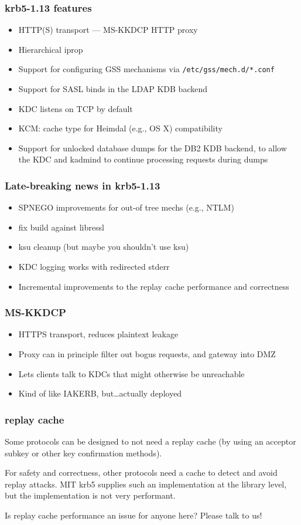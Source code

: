 \documentclass{beamer}
\begin{document}
\begin{frame}[fragile]
\frametitle{krb5-1.13 features}
\begin{itemize}
\item{HTTP(S) transport --- MS-KKDCP HTTP proxy}
\item{Hierarchical iprop}
\item{Support for configuring GSS mechanisms via \verb+/etc/gss/mech.d/*.conf+}
\item{Support for SASL binds in the LDAP KDB backend}
\item{KDC listens on TCP by default}
\item{KCM: cache type for Heimdal (e.g., OS X) compatibility}
\item{Support for unlocked database dumps for the DB2 KDB backend, to allow
	the KDC and kadmind to continue processing requests during dumps}
\end{itemize}
\end{frame}

\begin{frame}
\frametitle{Late-breaking news in krb5-1.13}
\begin{itemize}
\item{SPNEGO improvements for out-of tree mechs (e.g., NTLM)}
\item{fix build against libressl}
\item{ksu cleanup \pause (but maybe you shouldn't use ksu)}
\pause
\item{KDC logging works with redirected stderr}
\item{Incremental improvements to the replay cache performance and
	correctness}
\end{itemize}
\end{frame}

\begin{frame}
\frametitle{MS-KKDCP}
\begin{itemize}
\item{HTTPS transport, reduces plaintext leakage}
\item{Proxy can in principle filter out bogus requests, and gateway into DMZ}
\item{Lets clients talk to KDCs that might otherwise be unreachable}
\item{Kind of like IAKERB, but\ldots{}actually deployed}
\end{itemize}
\end{frame}

\begin{frame}
\frametitle{replay cache}
Some protocols can be designed to not need a replay cache (by using
an acceptor subkey or other key confirmation methods).

\vspace{1em}
For safety and correctness, other protocols need a cache to detect and
avoid replay attacks.  MIT krb5 supplies such an implementation at the
library level, but the implementation is not very performant.

\vspace{1em}
Is replay cache performance an issue for anyone here?  Please talk to us!
\end{frame}
\end{document}
